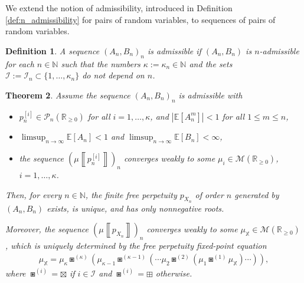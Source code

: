 \documentclass[a4paper,11pt]{amsart}
\numberwithin{equation}{section}
\newtheorem{theorem}{Theorem}[section]
\newtheorem{definition}[theorem]{Definition}
\newcommand{\N}{\mathbb{N}}
\newcommand{\E}{\mathbb{E}}
\newcommand{\R}{\mathbb{R}}
\newcommand{\pols}{\mathcal P}
\newcommand{\MM}{\mathcal{M}}
\def \X {{\mathbb X}}
\newcommand{\meas}[1]{\mu\! \left\llbracket #1 \right\rrbracket}
\begin{document}
We extend the notion of admissibility, introduced in Definition \ref{def:n_admissibility} for pairs of random variables, to sequences of pairs of random variables.

\begin{definition}\label{def_B_n}
A sequence $(A_n,B_n)_n$ is admissible if $(A_n,B_n)$ is $n$-admissible for each $n\in\N$ such that the numbers $\kappa:=\kappa_n\in\N$ and the sets $\mathcal{I}:=\mathcal{I}_n\subset\{1,\ldots,\kappa_n\}$ do not depend on $n$. 

\end{definition}



\begin{theorem}\label{main_thm}
Assume the sequence $(A_n,B_n)_n$ is admissible with
\begin{itemize}
\item[(i)] $p_{n}^{[i]}\in\pols_n(\R_{\geq 0})$ for all $i=1,\ldots,\kappa$, and $|\E[A_n^m]|<1$ for all $1\leq m\leq n$, 
\item[(ii)]   $\limsup_{n\to\infty}\E[A_n]<1$ and  $\limsup_{n\to\infty}\E[B_n]<\infty$,
\item[(iii)] the sequence $(\meas{p_{n}^{[i]}})_n$ converges weakly to some $\mu_i\in\MM(\R_{\geq 0})$, $i=1,\ldots,\kappa$. 
\end{itemize}
Then, for every \(n\in\N\), the finite free perpetuity \(p_{X_n}\) of order \(n\)
generated by \((A_n,B_n)\) exists, is unique, and has only nonnegative roots.

Moreover, the sequence $(\meas{p_{X_n}})_n$ converges weakly to some $\mu_{\X}\in\mathcal{M}(\R_{\ge0})$, which is uniquely determined by the free perpetuity fixed-point equation
\begin{align}\label{eq:free_perp_admis}
\mu_\X =  \mu_\kappa\boxast^{(\kappa)} \left( \mu_{\kappa-1}\boxast^{(\kappa-1)}\left(\cdots \mu_2 \boxast^{(2)}\left( \mu_1\boxast^{(1)} \mu_\X\right)\cdots \right)\right),
\end{align}
where $\boxast^{(i)} = \boxtimes$ if $i\in\mathcal{I}$ and $\boxast^{(i)} = \boxplus$ otherwise. 
\end{theorem}
\end{document}
